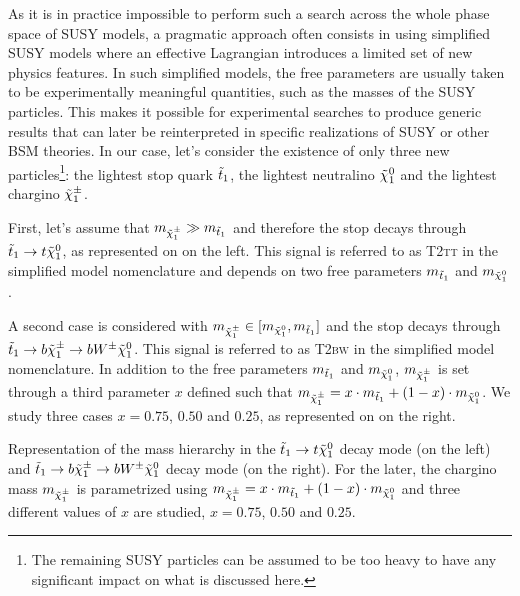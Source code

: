     As it is in practice impossible to perform such a search across the whole phase
    space of SUSY models, a pragmatic approach often consists in using simplified SUSY
    models where an
    effective Lagrangian introduces a limited set of new physics features. In such
    simplified models, the free parameters are usually taken to be experimentally
    meaningful quantities, such as the masses of the SUSY particles. This makes
    it possible for experimental searches to produce generic results that can later
    be reinterpreted in specific realizations of SUSY \cite{LiemSMS, SmodelS}
    or other BSM theories. In our case, let's consider the existence of only three new
    particles\footnote{The remaining SUSY particles can be assumed to be too heavy to
    have any significant impact on what is discussed here.}: the lightest stop quark
    $\tilde{t}_1$, the lightest neutralino $\tilde{\chi}_1^0$ and the lightest chargino $
    \tilde{\chi}_1^\pm$.

    First, let's assume that $m_{\tilde{\chi}_1^\pm} \gg m_{\tilde{t}_1}$ and therefore the
    stop decays through $\tilde{t}_1 \rightarrow t \tilde{\chi}_1^0$, as represented on
     on the left. This signal is referred to as \textsc{T2tt}
    in the simplified model nomenclature and depends on two free parameters
    $m_{\tilde{t}_1}$ and $m_{\tilde{\chi}_1^0}$.

    A second case is considered with $m_{\tilde{\chi}_1^\pm} \in [m_{\tilde{\chi}_1^0},
    m_{\tilde{t}_1}]$ and the stop decays through $\tilde{t}_1 \rightarrow b \tilde{\chi}_1^\pm
    \rightarrow b W^{\pm} \tilde{\chi}_1^0$. This signal is referred to as \textsc{T2bw}
    in the simplified model nomenclature. In addition to the free  parameters
    $m_{\tilde{t}_1}$ and $m_{\tilde{\chi}_1^0}$, $m_{\tilde{\chi}_1^\pm}$ is set through a
    third parameter $x$ defined such that $m_{\tilde{\chi}_1^\pm} = x \cdot m_{\tilde{t}_1}
    + (1 - x) \cdot m_{\tilde{\chi}_1^0}$. We study three cases $x = 0.75$, $0.50$
    and $0.25$, as represented on  on the right.

                 {Representation of the mass hierarchy in the $\tilde{t}_1 \rightarrow t
                 \tilde{\chi}_1^0$ decay mode (on the left) and $\tilde{t}_1 \rightarrow b
                 \tilde{\chi}_1^\pm \rightarrow b W^{\pm} \tilde{\chi}_1^0 $ decay mode (on the
                 right). For the later, the chargino mass $m_{\tilde{\chi}_1^\pm}$ is
                 parametrized using $m_{\tilde{\chi}_1^\pm} = x \cdot m_{\tilde{t}_1}
                 + (1 - x) \cdot m_{\tilde{\chi}_1^0}$ and three different values of $x$
                 are studied, $x = 0.75$, $0.50$ and $0.25$.}

